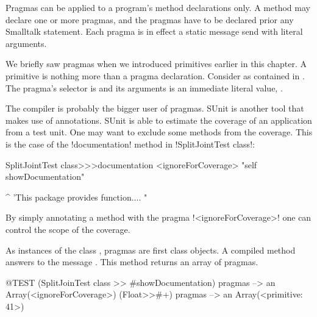 \documentclass[a4paper,10pt,twoside]{book}
\begin{document}
Pragmas can be applied to a program's method declarations only. A method may declare one or more pragmas, and the pragmas have to be declared prior any Smalltalk statement. Each pragma is in effect a static message send with literal arguments.

We briefly saw pragmas when we introduced primitives earlier in this chapter. A primitive is nothing more than a pragma declaration. 
Consider  as contained in . The pragma's selector is  and its arguments is an immediate literal value, . 

The compiler is probably the bigger user of pragmas. SUnit is another tool that makes use of annotations. SUnit is able to estimate the coverage of an application from a test unit. One may want to exclude some methods from the coverage. This is the case of the \ct!documentation! method in \ct!SplitJointTest class!:

\begin{code}{}
SplitJointTest class>>>documentation
	<ignoreForCoverage>
	"self showDocumentation"
	
	^ 'This package provides function.... "
\end{code}

By simply annotating a method with the pragma \ct!<ignoreForCoverage>! one can control the scope of the coverage.


%	


As instances of the class , pragmas are first class objects. A compiled method answers to the message . This method returns an array of pragmas. 

\begin{code}{@TEST}
(SplitJoinTest class >> #showDocumentation) pragmas
  --> an Array(<ignoreForCoverage>)
(Float>>#+) pragmas --> an Array(<primitive: 41>)
\end{code}
\end{document}
